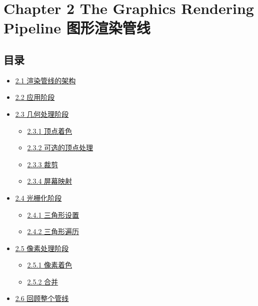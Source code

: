 \documentclass[
  paper=a4,
  ,captions=tableheading
]{scrartcl}
\author{}
\date{}
\title{}
\author{}
\date{}
\providecommand{\tightlist}{%
  \setlength{\itemsep}{0pt}\setlength{\parskip}{0pt}}
\begin{document}
\section{Chapter 2 The Graphics Rendering Pipeline
图形渲染管线}\label{chapter-2-the-graphics-rendering-pipeline-ux56feux5f62ux6e32ux67d3ux7ba1ux7ebf}

\subsection{目录}\label{ux76eeux5f55}

\begin{itemize}
\tightlist
\item
  \hyperref[21-ux6e32ux67d3ux7ba1ux7ebfux7684ux67b6ux6784]{2.1
  渲染管线的架构}
\item
  \hyperref[22-ux5e94ux7528ux9636ux6bb5]{2.2 应用阶段}
\item
  \hyperref[23-ux51e0ux4f55ux5904ux7406ux9636ux6bb5]{2.3 几何处理阶段}

  \begin{itemize}
  \tightlist
  \item
    \hyperref[231-ux9876ux70b9ux7740ux8272]{2.3.1 顶点着色}
  \item
    \hyperref[232-ux53efux9009ux7684ux9876ux70b9ux5904ux7406]{2.3.2
    可选的顶点处理}
  \item
    \hyperref[233-ux88c1ux526a]{2.3.3 裁剪}
  \item
    \hyperref[234-ux5c4fux5e55ux6620ux5c04]{2.3.4 屏幕映射}
  \end{itemize}
\item
  \hyperref[24-ux5149ux6805ux5316ux9636ux6bb5]{2.4 光栅化阶段}

  \begin{itemize}
  \tightlist
  \item
    \hyperref[241-ux4e09ux89d2ux5f62ux8bbeux7f6e]{2.4.1 三角形设置}
  \item
    \hyperref[242-ux4e09ux89d2ux5f62ux904dux5386]{2.4.2 三角形遍历}
  \end{itemize}
\item
  \hyperref[25-ux50cfux7d20ux5904ux7406ux9636ux6bb5]{2.5 像素处理阶段}

  \begin{itemize}
  \tightlist
  \item
    \hyperref[251-ux50cfux7d20ux7740ux8272]{2.5.1 像素着色}
  \item
    \hyperref[252-ux5408ux5e76]{2.5.2 合并}
  \end{itemize}
\item
  \hyperref[26-ux56deux987eux6574ux4e2aux7ba1ux7ebf]{2.6 回顾整个管线}


\end{itemize}
\end{document}
